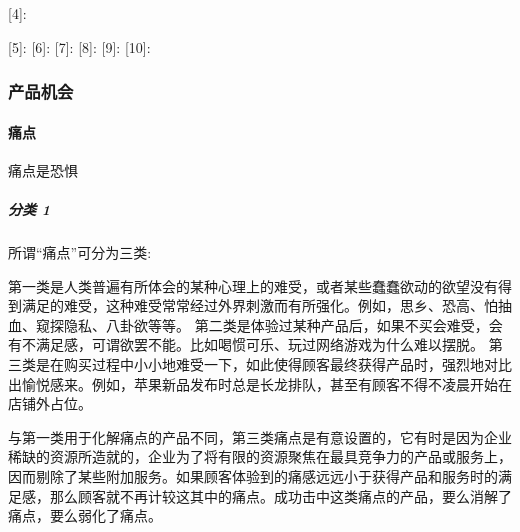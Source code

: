 \documentclass[letterpaper,11pt,english]{sphinxmanual}
\begin{document}
{[}4{]}: %
\begin{footnote}[107]\sphinxAtStartFootnote
{}
%
\end{footnote} {[}5{]}:
 {[}6{]}:
 {[}7{]}:
 {[}8{]}:
 {[}9{]}:
 {[}10{]}:


\subsubsection{产品机会}
\label{\detokenize{chapter_introduction/opportunity:id1}}\label{\detokenize{chapter_introduction/opportunity::doc}}

\paragraph{痛点}
\label{\detokenize{chapter_introduction/opportunity:id2}}
痛点是恐惧


\subparagraph{分类 1\sphinxfootnotemark[108]}
\label{\detokenize{chapter_introduction/opportunity:id3}}%
\begin{footnotetext}[108]\sphinxAtStartFootnote
{}
%
\end{footnotetext}\ignorespaces 
所谓“痛点”可分为三类:

第一类是人类普遍有所体会的某种心理上的难受，或者某些蠢蠢欲动的欲望没有得到满足的难受，这种难受常常经过外界刺激而有所强化。例如，思乡、恐高、怕抽血、窥探隐私、八卦欲等等。
第二类是体验过某种产品后，如果不买会难受，会有不满足感，可谓欲罢不能。比如喝惯可乐、玩过网络游戏为什么难以摆脱。
第三类是在购买过程中小小地难受一下，如此使得顾客最终获得产品时，强烈地对比出愉悦感来。例如，苹果新品发布时总是长龙排队，甚至有顾客不得不凌晨开始在店铺外占位。

与第一类用于化解痛点的产品不同，第三类痛点是有意设置的，它有时是因为企业稀缺的资源所造就的，企业为了将有限的资源聚焦在最具竞争力的产品或服务上，因而剔除了某些附加服务。如果顾客体验到的痛感远远小于获得产品和服务时的满足感，那么顾客就不再计较这其中的痛点。成功击中这类痛点的产品，要么消解了痛点，要么弱化了痛点。
\end{document}
